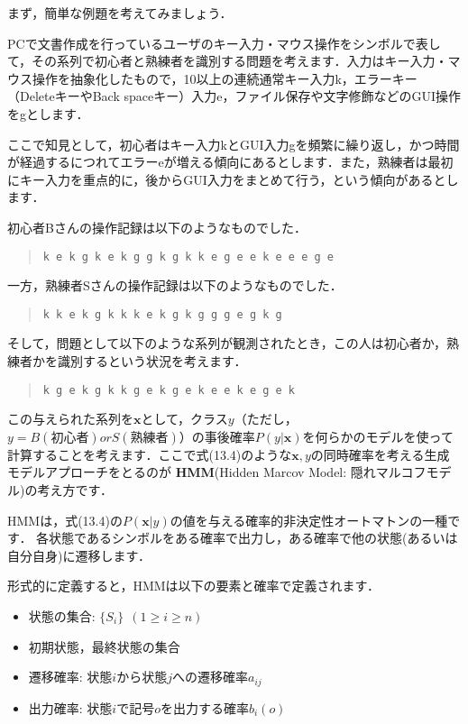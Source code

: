 まず，簡単な例題を考えてみましょう．

PCで文書作成を行っているユーザのキー入力・マウス操作をシンボルで表して，その系列で初心者と熟練者を識別する問題を考えます．入力はキー入力・マウス操作を抽象化したもので，10以上の連続通常キー入力k，エラーキー（DeleteキーやBack spaceキー）入力e，ファイル保存や文字修飾などのGUI操作をgとします．

ここで知見として，初心者はキー入力kとGUI入力gを頻繁に繰り返し，かつ時間が経過するにつれてエラーeが増える傾向にあるとします．また，熟練者は最初にキー入力を重点的に，後からGUI入力をまとめて行う，という傾向があるとします．

初心者Bさんの操作記録は以下のようなものでした．

\begin{quote}
\tt k e k g k e k g g k g k k e g e e k e e e g e
\end{quote}

一方，熟練者Sさんの操作記録は以下のようなものでした．

\begin{quote}
\tt k k e k g k k k e k g k g g g e g k g
\end{quote}

そして，問題として以下のような系列が観測されたとき，この人は初心者か，熟練者かを識別するという状況を考えます．

\begin{quote}
\tt k g e k g k k g e k g e k e e k e g e k
\end{quote}


この与えられた系列を$\bm{x}$として，クラス$y$（ただし，$y= B (初心者) or S (熟練者)$）の事後確率$P(y|\bm{x})$を何らかのモデルを使って計算することを考えます．ここで式(13.4)のような$\bm{x}, y$の同時確率を考える生成モデルアプローチをとるのが
\textbf{HMM}(Hidden Marcov Model: 隠れマルコフモデル)の考え方です．

HMMは，式(13.4)の$P(\bm{x}|y)$の値を与える確率的非決定性オートマトンの一種です．
各状態であるシンボルをある確率で出力し，ある確率で他の状態(あるいは自分自身)に遷移します．


形式的に定義すると，HMMは以下の要素と確率で定義されます．

\begin{itemize}
\item 状態の集合: $\{S_i\}~~(1 \ge i \ge n)$
\item 初期状態，最終状態の集合
\item 遷移確率: 状態$i$から状態$j$への遷移確率$a_{ij}$
\item 出力確率: 状態$i$で記号$o$を出力する確率$b_i(o)$
\end{itemize}

